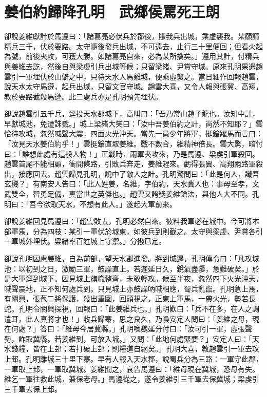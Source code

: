 
\chapter{姜伯約歸降孔明　武鄉侯罵死王朗}

卻說姜維獻計於馬遵曰：「諸葛亮必伏兵於郡後，賺我兵出城，乘虛襲我。某願請精兵三千，伏於要路。太守隨後發兵出城，不可遠去，止行三十里便回；但看火起為號，前後夾攻，可獲大勝。如諸葛亮自來，必為某所擒矣。」遵用其計，付精兵與姜維去訖，然後自與梁虔引兵出城等候；只留梁緒、尹賞守城。原來孔明果遣趙雲引一軍埋伏於山僻之中，只待天水人馬離城，便乘虛襲之。當日細作回報趙雲，說天水太守馬遵，起兵出城，只留文官守城。趙雲大喜，又令人報與張翼、高翔，教於要路截殺馬遵。此二處兵亦是孔明預先埋伏。

卻說趙雲引五千兵，逕投天水郡城下，高叫曰：「吾乃常山趙子龍也。汝知中計，早獻城池，免遭誅戮。」城上梁緒大笑曰：「汝中吾姜伯約之計，尚然不知耶？」雲恰待攻城，忽然喊聲大震，四面火光沖天。當先一員少年將軍，挺鎗躍馬而言曰：「汝見天水姜伯約乎！」雲挺鎗直取姜維。戰不數合，維精神倍長。雲大驚，暗忖曰：「誰想此處有這般人物！」正戰時，兩軍夾攻來，乃是馬遵、梁虔引軍殺回。趙雲首尾不能相顧，衝開條路，引敗兵奔走，姜維趕來。虧得張翼、高翔兩路軍殺出，接應回去。趙雲歸見孔明，說中了敵人之計。孔明驚問曰：「此是何人，識吾玄機？」有南安人告曰：「此人姓姜，名維，字伯約，天水冀人也：事母至孝，文武雙全，智勇足備，真當世之英傑也。」趙雲又誇獎姜維鎗法，與他人大不同。孔明曰：「吾今欲取天水，不想有此人。」遂起大軍前來。

卻說姜維回見馬遵曰：「趙雲敗去，孔明必然自來。彼料我軍必在城中。今可將本部軍馬，分為四枝：某引一軍伏於城東，如彼兵到則截之。太守與梁虔、尹賞各引一軍城外埋伏。梁緒率百姓城上守禦。」分撥已定。

卻說孔明因慮姜維，自為前部，望天水郡進發。將到城邊，孔明傳令曰：「凡攻城池：以初到之日，激勵三軍，鼓譟直上。若遲延日久，銳氣盡隳，急難破矣。」於是大軍逕到城下。因見城上旗幟整齊，未敢輕攻。候至半夜，忽然四下火光沖天，喊聲震地，正不知何處兵到。只見城上亦鼓譟吶喊相應，蜀兵亂竄。孔明急上馬，有關興，張苞二將保護，殺出重圍，回頭視之，正東上軍馬，一帶火光，勢若長蛇。孔明令關興探視，回報曰：「此姜維兵也。」孔明歎曰：「兵不在多，在人之調遣耳，此人真將才也！」收兵歸寨，思之良久，乃喚安定人問曰：「姜維之母，現在何處？」答曰：「維母今居冀縣。」孔明喚魏延分付曰：「汝可引一軍，虛張聲勢，詐取冀縣。若姜維到，可放入城。」又問：「此地何處緊要？」安定人曰：「天水錢糧，皆在上邽；若打破上邽；則糧道自絕矣。」孔明大喜，教趙雲引一軍去攻上邽。孔明離城三十里下寨。早有人報入天水郡，說蜀兵分為三路：一軍守此郡，一軍取上邽，一軍取冀城。姜維聞之，哀告馬遵曰：「維母現在冀城，恐母有失。維乞一軍往救此城，兼保老母。」馬遵從之，遂令姜維引三千軍去保冀城；梁虔引三千軍去保上邽。

